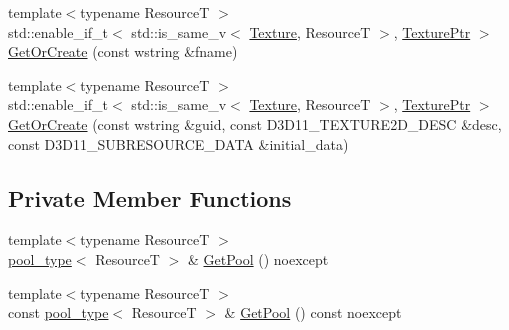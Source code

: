 \begin{DoxyCompactItemize}
\item 
{\footnotesize template$<$typename ResourceT $>$ }\\std\+::enable\+\_\+if\+\_\+t$<$ std\+::is\+\_\+same\+\_\+v$<$ \hyperlink{classmage_1_1rendering_1_1_texture}{Texture}, ResourceT $>$, \hyperlink{namespacemage_1_1rendering_a6f3ae54f825328465b0cdde0f0de4a36}{Texture\+Ptr} $>$ \hyperlink{classmage_1_1rendering_1_1_resource_manager_a5a1db7a1b2aae7e2ea5759820c875d78}{Get\+Or\+Create} (const wstring \&fname)
\item 
{\footnotesize template$<$typename ResourceT $>$ }\\std\+::enable\+\_\+if\+\_\+t$<$ std\+::is\+\_\+same\+\_\+v$<$ \hyperlink{classmage_1_1rendering_1_1_texture}{Texture}, ResourceT $>$, \hyperlink{namespacemage_1_1rendering_a6f3ae54f825328465b0cdde0f0de4a36}{Texture\+Ptr} $>$ \hyperlink{classmage_1_1rendering_1_1_resource_manager_a330efb725a94fec87a996e0048589d1b}{Get\+Or\+Create} (const wstring \&guid, const D3\+D11\+\_\+\+T\+E\+X\+T\+U\+R\+E2\+D\+\_\+\+D\+E\+SC \&desc, const D3\+D11\+\_\+\+S\+U\+B\+R\+E\+S\+O\+U\+R\+C\+E\+\_\+\+D\+A\+TA \&initial\+\_\+data)
\end{DoxyCompactItemize}
\subsection*{Private Member Functions}
\begin{DoxyCompactItemize}
\item 
{\footnotesize template$<$typename ResourceT $>$ }\\\hyperlink{classmage_1_1rendering_1_1_resource_manager_ab21a4e280087032ee533f267bd9bf602}{pool\+\_\+type}$<$ ResourceT $>$ \& \hyperlink{classmage_1_1rendering_1_1_resource_manager_a91891df90f569c3f3f72a51c8a2f6ae5}{Get\+Pool} () noexcept
\item 
{\footnotesize template$<$typename ResourceT $>$ }\\const \hyperlink{classmage_1_1rendering_1_1_resource_manager_ab21a4e280087032ee533f267bd9bf602}{pool\+\_\+type}$<$ ResourceT $>$ \& \hyperlink{classmage_1_1rendering_1_1_resource_manager_a5cba7eab859779a7cb74d5f2cef21173}{Get\+Pool} () const noexcept
\end{DoxyCompactItemize}
